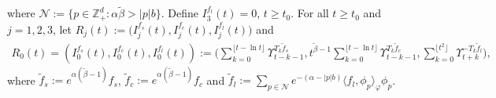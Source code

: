 \documentclass[12pt,a4paper]{amsart}
\theoremstyle{plain}
\theoremstyle{definition}
\numberwithin{equation}{section}
\begin{document}
where $\mathcal N:= \{p\in \mathbb Z_+^d: \alpha \tilde \beta > |p|b\}$.
Define $I_3^{f_l}(t)=0$, $t\geq t_0$. For all $t\geq t_0$ and $j=1,2,3$, let
\(
   R_j(t):=\big(I_j^{f_s}(t),I_j^{f_c}(t),I_j^{f_l}(t)\big)
\)
and
\begin{align}
    R_0(t)=(I_0^{f_s}(t),I_0^{f_c}(t),I_0^{f_l}(t)):=\big(\sum_{k=0}^{\lfloor t-\ln t \rfloor} \Upsilon_{t-k-1}^{T_k \tilde f_s},t^{\tilde \beta - 1}\sum_{k=0}^{\lfloor t-\ln t \rfloor} \Upsilon_{t-k-1}^{T_{k} \tilde f_c},\sum_{k = 0}^{\lfloor t^2 \rfloor} \Upsilon_{t+k}^{- T_k \tilde f_l}\big),
\end{align}
where $\tilde f_s:=e^{\alpha(\tilde \beta - 1)} f_s$, $\tilde f_c:=e^{\alpha(\tilde \beta - 1)} f_c$ and  $\tilde f_l := \sum_{p\in \mathcal N} e^{-(\alpha - |p|b)}\langle f_l, \phi_p \rangle_\varphi \phi_p$.
\end{document}

